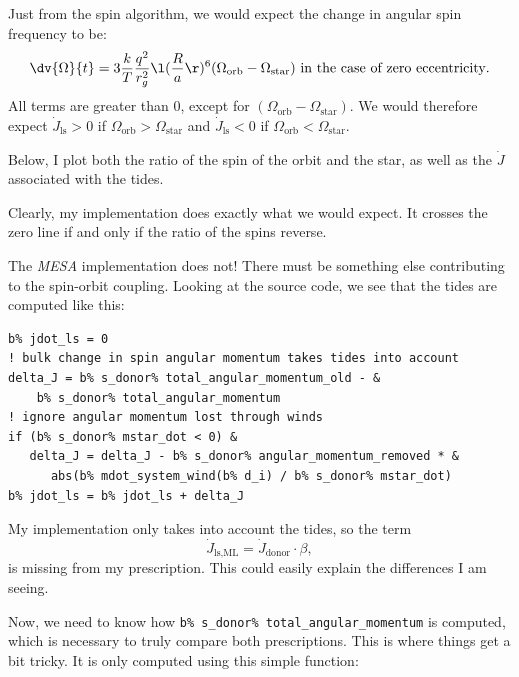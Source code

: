 \documentclass[a4paper,10pt]{article}
\begin{document}
Just from the \citet{hut1981} spin algorithm, we would expect the change in angular spin frequency to be:
\begin{equation*}
    \dv{\Omega}{t} = 3 \frac{k}{T} \frac{q^{2} }{r_{g}^{2}  }\l(\frac{R}{a}\r)^{6}(\Omega_\text{orb} - \Omega_\text{star})\text{ in the case of zero eccentricity}.
\end{equation*}
All terms are greater than 0, except for \((\Omega_\text{orb} - \Omega_\text{star})\). We would therefore expect \(\dot{J}_\text{ls} > 0 \) if \(\Omega_\text{orb} > \Omega_\text{star}\) and \(\dot{J}_\text{ls} < 0 \) if \(\Omega_\text{orb} < \Omega_\text{star}\).

Below, I plot both the ratio of the spin of the orbit and the star, as well as the \(\dot{J}\) associated with the tides.
\begin{figure}[ht]
    \centering
\end{figure}

Clearly, my implementation does exactly what we would expect. It crosses the zero line if and only if the ratio of the spins reverse.

The \emph{MESA} implementation does not! There must be something else contributing to the spin-orbit coupling.
Looking at the source code, we see that the tides are computed like this:

\begin{verbatim}
b% jdot_ls = 0
! bulk change in spin angular momentum takes tides into account
delta_J = b% s_donor% total_angular_momentum_old - &
    b% s_donor% total_angular_momentum
! ignore angular momentum lost through winds
if (b% s_donor% mstar_dot < 0) &
   delta_J = delta_J - b% s_donor% angular_momentum_removed * &
      abs(b% mdot_system_wind(b% d_i) / b% s_donor% mstar_dot)
b% jdot_ls = b% jdot_ls + delta_J
\end{verbatim}

My implementation only takes into account the tides, so the term
\begin{equation*}
    \dot{J}_\text{ls,ML} = \dot{J}_\text{donor} \cdot \beta,
\end{equation*}
is missing from my prescription.
This could easily explain the differences I am seeing.

Now, we need to know how \lstinline[style=output, breaklines=true]|b% s_donor% total_angular_momentum| is computed, which is necessary to truly compare both prescriptions. This is where things get a bit tricky. It is only computed using this simple function:
\end{document}
